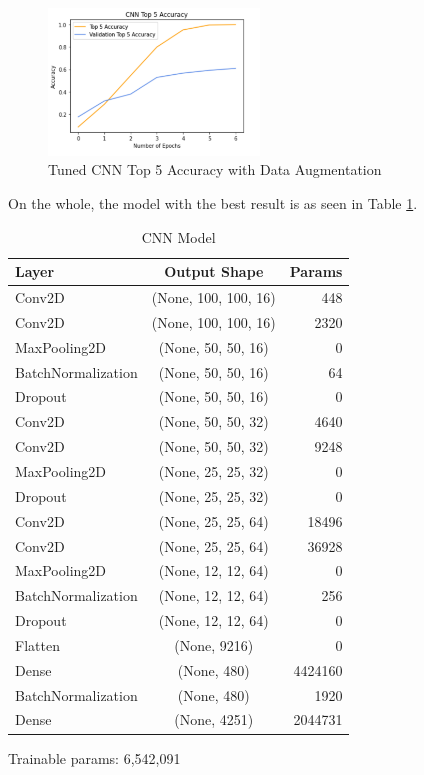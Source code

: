 \documentclass[paper=a4, fontsize=11pt]{scrartcl}
\numberwithin{equation}{section}		%
\numberwithin{table}{section}				%
\begin{document}
\begin{figure}[!h]
    \centering
    \includegraphics[width=0.5\textwidth]{images/cnntop5.png}
    \caption{Tuned CNN Top 5 Accuracy with Data Augmentation}
    \label{fig:top5cnn}
\end{figure}

On the whole, the model with the best result is as seen in Table \ref{tab:cnn_model}.

\begin{table}[!h]
  \begin{center}
    \caption{CNN Model}
    \label{tab:cnn_model}
    \begin{tabular}{l|c|r} %
      \textbf{Layer} & \textbf{Output Shape} & \textbf{Params}\\
      \hline
      Conv2D & (None, 100, 100, 16) & 448 \\
      Conv2D & (None, 100, 100, 16) & 2320 \\
      MaxPooling2D & (None, 50, 50, 16) & 0\\
      BatchNormalization & (None, 50, 50, 16) & 64\\
      Dropout & (None, 50, 50, 16) & 0\\
      Conv2D & (None, 50, 50, 32) & 4640 \\
      Conv2D & (None, 50, 50, 32) & 9248 \\
      MaxPooling2D & (None, 25, 25, 32)  & 0\\
      Dropout & (None, 25, 25, 32) & 0\\
      Conv2D & (None, 25, 25, 64) & 18496 \\
      Conv2D & (None, 25, 25, 64) & 36928 \\
      MaxPooling2D & (None, 12, 12, 64) & 0\\
      BatchNormalization & (None, 12, 12, 64) & 256\\
      Dropout & (None, 12, 12, 64) & 0\\
      Flatten & (None, 9216) & 0 \\
      Dense & (None, 480) & 4424160 \\
      BatchNormalization & (None, 480) & 1920\\
      Dense & (None, 4251) & 2044731 \\
    \end{tabular}
      \small
      \item Trainable params: 6,542,091
  \end{center}
\end{table}
\end{document}

